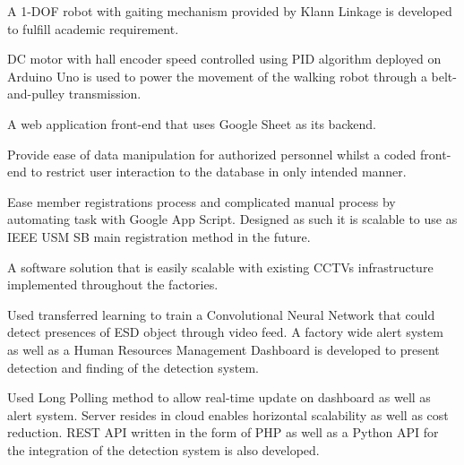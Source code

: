 \documentclass[letterpaper]{deedy-resume} %
\begin{document}

\newpage %

\begin{minipage}[t]{0.33\textwidth} %
\end{minipage}
\hfill
\begin{minipage}[t]{0.66\textwidth} %

\vspace{\topsep}
\begin{tightitemize}
\item A 1-DOF robot with gaiting mechanism provided by Klann Linkage is developed to fulfill academic requirement.
\item DC motor with hall encoder speed controlled using PID algorithm deployed on Arduino Uno is used to power the movement of the walking robot through a belt-and-pulley transmission.
\end{tightitemize}
\sectionspace %

\vspace{\topsep}
\begin{tightitemize}
\item A web application front-end that uses Google Sheet as its backend.
\item Provide ease of data manipulation for authorized personnel whilst a coded front-end to restrict user interaction to the database in only intended manner.
\item Ease member registrations process and complicated manual process by automating task with Google App Script.
Designed as such it is scalable to use as IEEE USM SB main registration method in the future.
\end{tightitemize}
\sectionspace %

\vspace{\topsep}
\begin{tightitemize}
\item A software solution that is easily scalable with existing CCTVs infrastructure implemented throughout the factories.
\item Used transferred learning to train a Convolutional Neural Network that could detect presences of ESD object through video feed.
A factory wide alert system as well as a Human Resources Management Dashboard is developed to present detection and finding of the detection system.
\item Used Long Polling method to allow real-time update on dashboard as well as alert system.
Server resides in cloud enables horizontal scalability as well as cost reduction.
REST API written in the form of PHP as well as a Python API for the integration of the detection system is also developed.
\end{tightitemize}
\sectionspace %


\end{minipage}
\end{document}
